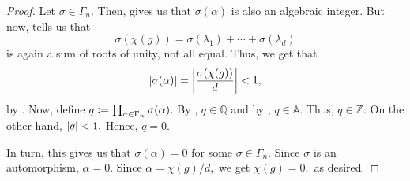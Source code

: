 \begin{proof}
	Let $\sigma \in \Gamma_n.$ Then,  gives us that $\sigma(\alpha)$ is also an algebraic integer. But now,  tells us that
	\begin{equation*} 
		\sigma(\chi(g)) = \sigma(\lambda_1) + \cdots + \sigma(\lambda_d)
	\end{equation*}
	is again a sum of roots of unity, not all equal. Thus, we get that
	\begin{equation*} 
		{\left\lvert \sigma(\alpha) \right\lvert} = {\left\lvert \frac{\sigma(\chi(g))}{d} \right\lvert} < 1,
	\end{equation*}
	by . Now, define $q \vcentcolon= \prod_{\sigma \in \Gamma_n}\sigma(\alpha).$ By , $q \in \mathbb{Q}$ and by , $q \in \mathbb{A}.$ Thus, $q \in \mathbb{Z}.$ On the other hand, ${\left\lvert q \right\lvert} < 1.$ Hence, $q = 0.$

	In turn, this gives us that $\sigma(\alpha) = 0$ for some $\sigma \in \Gamma_n.$ Since $\sigma$ is an automorphism, $\alpha = 0.$ Since $\alpha = \chi(g)/d,$ we get $\chi(g) = 0,$ as desired.
\end{proof}

